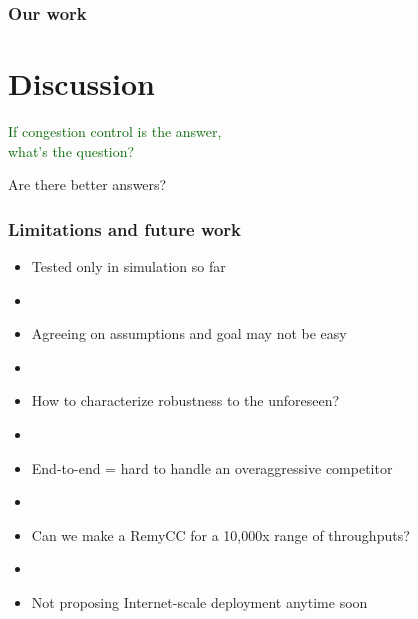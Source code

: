 \documentclass[svgnames]{beamer}
\begin{document}
\begin{frame}

\frametitle{Our work}
\section{Discussion}

\begin{centering}

\LARGE \textcolor{DarkGreen}{If congestion control is the answer,\\what's the question?}

\vspace{\baselineskip}

\LARGE \textcolor{NavyBlue}{Are there better answers?}

\end{centering}

\end{frame}

\begin{frame}
\frametitle{Limitations and future work}

\begin{itemize}
\item Tested only in simulation so far

\item[]

\item Agreeing on assumptions and goal may not be easy

\item[]

\item How to characterize robustness to the unforeseen?

\item[]

\item End-to-end = hard to handle an overaggressive competitor

\item[]

\item Can we make a RemyCC for a 10,000x range of throughputs?

\item[]

\item Not proposing Internet-scale deployment anytime soon

\end{itemize}

\end{frame}
\end{document}
